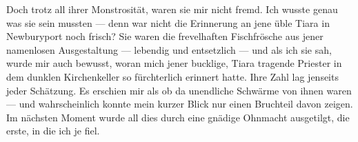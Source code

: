 Doch trotz all ihrer Monstrosität, waren sie mir nicht fremd. Ich wusste genau was sie sein mussten --- denn war nicht die Erinnerung an jene üble Tiara in Newburyport noch frisch? Sie waren die frevelhaften Fischfrösche aus jener namenlosen Ausgestaltung --- lebendig und entsetzlich --- und als ich sie sah, wurde mir auch bewusst, woran mich jener bucklige, Tiara tragende Priester in dem dunklen Kirchenkeller so fürchterlich erinnert hatte. Ihre Zahl lag jenseits jeder Schätzung. Es erschien mir als ob da unendliche Schwärme von ihnen waren --- und wahrscheinlich konnte mein kurzer Blick nur einen Bruchteil davon zeigen. Im nächsten Moment wurde all dies durch eine gnädige Ohnmacht ausgetilgt, die erste, in die ich je fiel.
